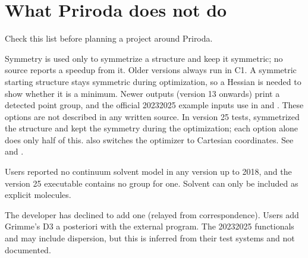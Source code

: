 \documentclass[letterpaper,10pt,english,openany,oneside]{sphinxmanual}
\begin{document}
\section{What Priroda does not do}
\label{\detokenize{start/about:what-priroda-does-not-do}}\label{\detokenize{start/about:id1}}
\sphinxAtStartPar
Check this list before planning a project around Priroda.
\begin{description}
\sphinxAtStartPar
Symmetry is used only to symmetrize a structure and keep it symmetric; no source reports a speed\sphinxhyphen{}up from it.
Older versions always run in C1. A symmetric starting structure stays symmetric during optimization, so a
Hessian is needed to show whether it is a minimum. Newer outputs (version 13 onwards) print a detected point group, and
the official 2023\textendash{}2025 example inputs use  in  and . These options are not described
in any written source. In version 25 tests,  symmetrized the structure and 
kept the symmetry during the optimization; each option alone does only half of this.  also
switches the optimizer to Cartesian coordinates. See {\hyperref[\detokenize{reference/molecule:molecule-sym}]{}} and
{\hyperref[\detokenize{reference/optimize:optimize-symmetry}]{}}.



\sphinxAtStartPar
Users reported no continuum solvent model in any version up to 2018, and the version 25 executable contains no
group for one. Solvent can only be included as explicit molecules.



\sphinxAtStartPar
The developer has declined to add one (relayed from correspondence). Users add Grimme’s D3 a posteriori with the
external  program. The 2023\textendash{}2025 functionals  and  may include dispersion, but this is
inferred from their test systems and not documented.




\end{description}
\end{document}
